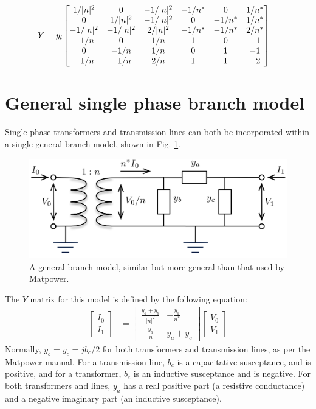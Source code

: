 \documentclass[11pt]{article}
\begin{document}
\begin{align}
Y &= 
y_l\begin{bmatrix}
	1/|n|^2 & 0 & -1/|n|^2 & -1/n^* & 0 & 1/n^* \\
	0 & 1/|n|^2 & -1/|n|^2 & 0 & -1/n^* & 1/n^* \\
	-1/|n|^2 & -1/|n|^2 & 2/|n|^2 & -1/n^* & -1/n^* & 2/n^* \\
	-1/n & 0 & 1/n & 1 & 0 & -1 \\
	0 & -1/n & 1/n & 0 & 1 & -1 \\
	-1/n & -1/n & 2/n & 1 & 1 & -2
\end{bmatrix}
\end{align}

\section{General single phase branch model}
\label{SEC_GEN_BRANCH_MODEL}
Single phase transformers and transmission lines can both be incorporated within a single general branch model, shown in Fig. \ref{FIG_GEN_BRANCH_MODEL}.
\begin{figure}[!h]
	\begin{center}
		\includegraphics[width=(9cm)]{branch.png}
	\end{center}
	\caption{
		A general branch model, similar but more general than that used by {\sc Matpower}.
	}
	\label{FIG_GEN_BRANCH_MODEL}
\end{figure}
The $Y$ matrix for this model is defined by the following equation:
\begin{align}
	\begin{bmatrix}I_0 \\ I_1\end{bmatrix} &=
	\begin{bmatrix}\frac{y_a + y_b}{|n|^2} & -\frac{y_a}{n^*} \\ -\frac{y_a}{n} & y_a + y_c \end{bmatrix}
	\begin{bmatrix}V_0 \\ V_1\end{bmatrix}
\end{align}
Normally, $y_b = y_c = jb_c/2$ for both transformers and transmission lines, as per the {\sc Matpower} manual. For a transmission line, $b_c$ is a capacitative susceptance, and is positive, and for a transformer, $b_c$ is an inductive susceptance and is negative. For both transformers and lines, $y_a$ has a real positive part (a resistive conductance) and a negative imaginary part (an inductive susceptance).
\end{document}
